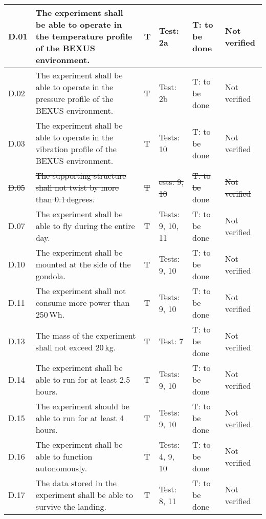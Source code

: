 \begin{longtable}[]{|m{}| m{}|m{}|m{}|m{}|m{}|}
D.01 & The experiment shall be able to operate in the temperature profile of the BEXUS environment.
& T & Test: 2a & T: to be done & Not verified \\\hline

D.02 & The experiment shall be able to operate in the pressure profile of the BEXUS environment.
& T & Test: 2b  & T: to be done & Not verified \\\hline

D.03 & The experiment shall be able to operate in the vibration profile of the BEXUS environment.
& T & Tests: 10 & T: to be done & Not verified \\\hline

\st{D.05 }& \st{The supporting structure shall not twist by more than 0.1\,degrees.}
& \st{T} & \st{ests: 9, 10} & \st{T: to be done} & \st{Not verified} \\\hline

D.07 & The experiment shall be able to fly during the entire day.
& T & Tests: 9, 10, 11 & T: to be done & Not verified \\\hline

D.10 & The experiment shall be mounted at the side of the gondola.
& T & Tests: 9, 10 & T: to be done & Not verified \\\hline

D.11 & The experiment shall not consume more power than 250\,Wh.
& T & Tests: 9, 10 & T: to be done & Not verified \\\hline

D.13 & The mass of the experiment shall not exceed 20\,kg.
& T & Test: 7 & T: to be done & Not verified \\\hline

D.14 & The experiment shall be able to run for at least 2.5\,hours.
& T & Tests: 9, 10 & T: to be done & Not verified \\\hline

D.15 & The experiment should be able to run for at least 4\,hours.
& T & Tests: 9, 10 & T: to be done & Not verified \\\hline

D.16 & The experiment shall be able to function autonomously.
& T & Tests: 4, 9, 10 & T: to be done & Not verified \\\hline

D.17 & The data stored in the experiment shall be able to survive the landing.
& T & Test: 8, 11 & T: to be done & Not verified \\\hline


\end{longtable}
